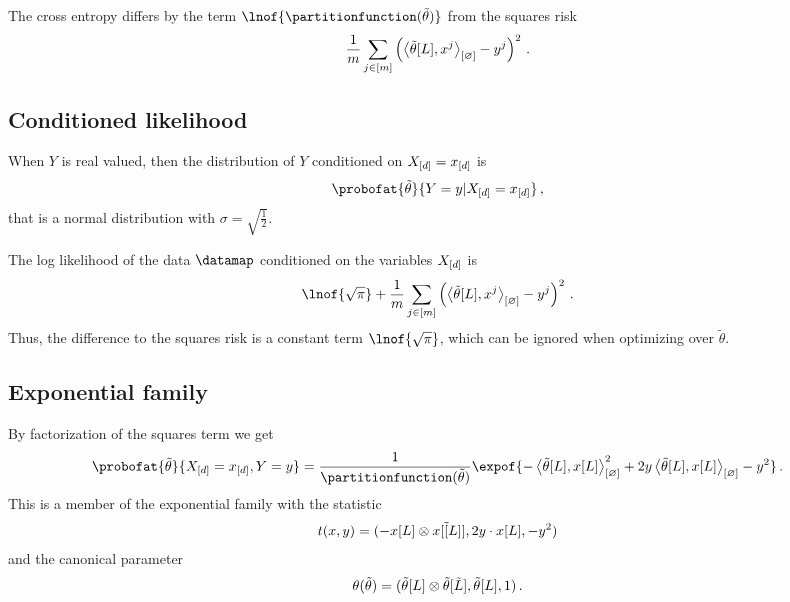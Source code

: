 \documentclass[aps,onecolumn,nofootinbib,pra]{article}
\newcommand{\slopevec}{\tilde{\theta}}
\begin{document}
    The cross entropy differs by the term $\lnof{\partitionfunction(\slopevec)}$ from the squares risk
    \begin{align*}
        \frac{1}{\datdim} \sum_{\datindexin}
        \left(\contraction{\slopevec[L],\catindex^\datindex} - y^\datindex\right)^2 \, .
    \end{align*}

    \subsection{Conditioned likelihood}

    When $Y$ is real valued, then the distribution of $Y$ conditioned on $X_{[d]}=x_{[d]}$ is
    \begin{align*}
        \probofat{\slopevec}{Y=y|\indexedshortcatvariables} \, ,
    \end{align*}
    that is a normal distribution with $\sigma=\sqrt{\frac{1}{2}}$.

    The log likelihood of the data $\datamap$ conditioned on the variables $X_{[d]}$ is
    \begin{align*}
        \lnof{\sqrt{\pi}} +
        \frac{1}{\datdim} \sum_{\datindexin}
        \left(\contraction{\slopevec[L],\catindex^\datindex} - y^\datindex\right)^2 \, .
    \end{align*}
    Thus, the difference to the squares risk is a constant term $\lnof{\sqrt{\pi}}$, which can be ignored when optimizing over $\slopevec$.

    \subsection{Exponential family}

    By factorization of the squares term we get
    \begin{align*}
        \probofat{\slopevec}{\indexedshortcatvariables,Y=y}
        =
        \frac{1}{\partitionfunction(\slopevec)}
        \expof{
            -\contraction{\slopevec[L],x[L]}^2
            + 2 y \contraction{\slopevec[L],x[L]}
            - y^2
        } \, .
    \end{align*}
    This is a member of the exponential family with the statistic
    \begin{align*}
        t(x,y)
        = (-x[L]\otimes x[\tilde[L]], 2y \cdot x[L], -y^2)
    \end{align*}
    and the canonical parameter
    \begin{align*}
        \canparam(\slopevec)
        = (\slopevec[L]\otimes\slopevec[\tilde{L}], \slopevec[L], 1) \, .
    \end{align*}
\end{document}
